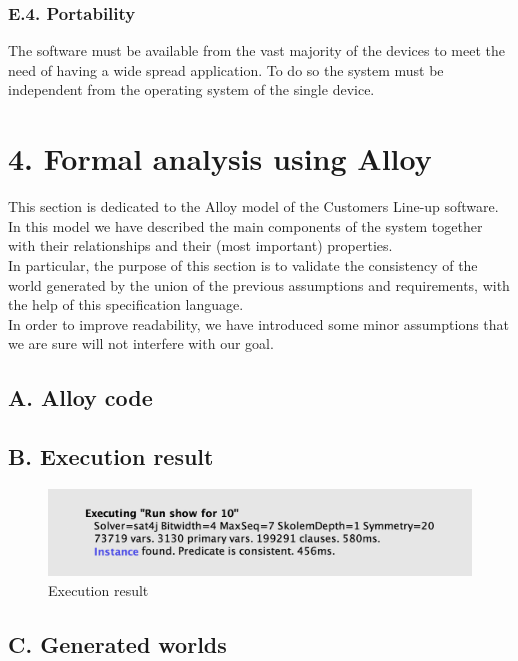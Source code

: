 \subsection{E.4. Portability}

The software must be available from the vast majority of the devices to meet the need of having a wide spread application. To do so the system must be independent from the operating system of the single device.

\chapter{4. Formal analysis using Alloy}

This section is dedicated to the Alloy model of the Customers Line-up software. In this model we have described the main components of the system together with their relationships and their (most important) properties.\\
In particular, the purpose of this section is to validate the consistency of the world generated by the union of the previous assumptions and requirements, with the help of this specification language.\\
In order to improve readability, we have introduced some minor assumptions that we are sure will not interfere with our goal.

\section{A. Alloy code}



\section{B. Execution result}

\begin{figure}[H]
\centering
\includegraphics{alloy/execution_result}
\caption{Execution result}
\end{figure}

\section{C. Generated worlds}

